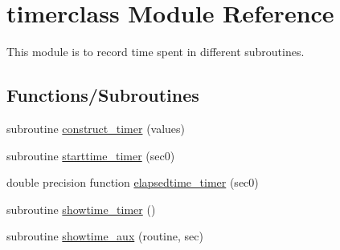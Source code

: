 \hypertarget{namespacetimerclass}{}\section{timerclass Module Reference}
\label{namespacetimerclass}


This module is to record time spent in different subroutines.  


\subsection*{Functions/\+Subroutines}
\begin{DoxyCompactItemize}
\item 
subroutine \mbox{\hyperlink{namespacetimerclass_a162c9c59b952268a3b7b544cff4f4295}{construct\+\_\+timer}} (values)
\item 
subroutine \mbox{\hyperlink{namespacetimerclass_afb272bcdcff72d225c2df5862630025c}{starttime\+\_\+timer}} (sec0)
\item 
double precision function \mbox{\hyperlink{namespacetimerclass_a3378d323d442f85aff95ab73cd13376d}{elapsedtime\+\_\+timer}} (sec0)
\item 
subroutine \mbox{\hyperlink{namespacetimerclass_aa34d67fa57ad546ab7e1a7fb1643e9b0}{showtime\+\_\+timer}} ()
\item 
subroutine \mbox{\hyperlink{namespacetimerclass_a3535b11970327778ddd27cee93c2288b}{showtime\+\_\+aux}} (routine, sec)
\end{DoxyCompactItemize}
